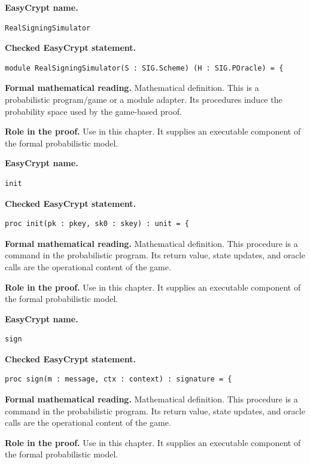 \begin{formaldefinition}
\noindent\textbf{EasyCrypt name.}
\begin{lstlisting}[language=EasyCrypt,basicstyle=\ttfamily\scriptsize]
RealSigningSimulator
\end{lstlisting}
\noindent\textbf{Checked EasyCrypt statement.}
\begin{lstlisting}[language=EasyCrypt,basicstyle=\ttfamily\scriptsize]
module RealSigningSimulator(S : SIG.Scheme) (H : SIG.POracle) = {
\end{lstlisting}
\noindent\textbf{Formal mathematical reading.}
Mathematical definition. This is a probabilistic program/game or a module adapter.  Its procedures induce the probability space used by the game-based proof.

\noindent\textbf{Role in the proof.}
Use in this chapter. It supplies an executable component of the formal probabilistic model.

\end{formaldefinition}

\begin{formaldefinition}
\noindent\textbf{EasyCrypt name.}
\begin{lstlisting}[language=EasyCrypt,basicstyle=\ttfamily\scriptsize]
init
\end{lstlisting}
\noindent\textbf{Checked EasyCrypt statement.}
\begin{lstlisting}[language=EasyCrypt,basicstyle=\ttfamily\scriptsize]
proc init(pk : pkey, sk0 : skey) : unit = {
\end{lstlisting}
\noindent\textbf{Formal mathematical reading.}
Mathematical definition. This procedure is a command in the probabilistic program.  Its return value, state updates, and oracle calls are the operational content of the game.

\noindent\textbf{Role in the proof.}
Use in this chapter. It supplies an executable component of the formal probabilistic model.

\end{formaldefinition}

\begin{formaldefinition}
\noindent\textbf{EasyCrypt name.}
\begin{lstlisting}[language=EasyCrypt,basicstyle=\ttfamily\scriptsize]
sign
\end{lstlisting}
\noindent\textbf{Checked EasyCrypt statement.}
\begin{lstlisting}[language=EasyCrypt,basicstyle=\ttfamily\scriptsize]
proc sign(m : message, ctx : context) : signature = {
\end{lstlisting}
\noindent\textbf{Formal mathematical reading.}
Mathematical definition. This procedure is a command in the probabilistic program.  Its return value, state updates, and oracle calls are the operational content of the game.

\noindent\textbf{Role in the proof.}
Use in this chapter. It supplies an executable component of the formal probabilistic model.

\end{formaldefinition}

